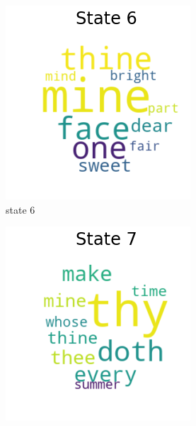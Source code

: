 \begin{figure}[H]
	\begin{subfigure}[t]{0.3\textwidth}
		\includegraphics[width=\textwidth]{download(6).png}
		\caption{state 6}
	\end{subfigure}%
	\begin{subfigure}[t]{0.3\textwidth}
		\includegraphics[width=\textwidth]{download(7).png}

\end{subfigure}
\end{figure}
